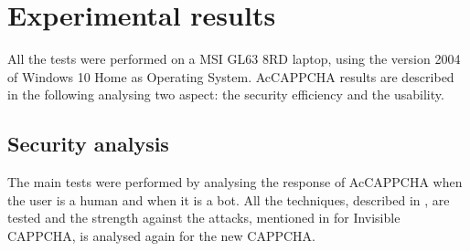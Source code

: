 \chapter{Experimental results}\label{chapter:Results}
All the tests were performed on a MSI GL63 8RD laptop, using the version 2004 of Windows 10 Home as Operating System. AcCAPPCHA results are described in the following analysing two aspect: the security efficiency and the usability.

\section{Security analysis}
The main tests were performed by analysing the response of AcCAPPCHA when the user is a human and when it is a bot. All the techniques, described in , are tested and the strength against the attacks, mentioned in  for Invisible CAPPCHA, is analysed again for the new CAPPCHA.  

